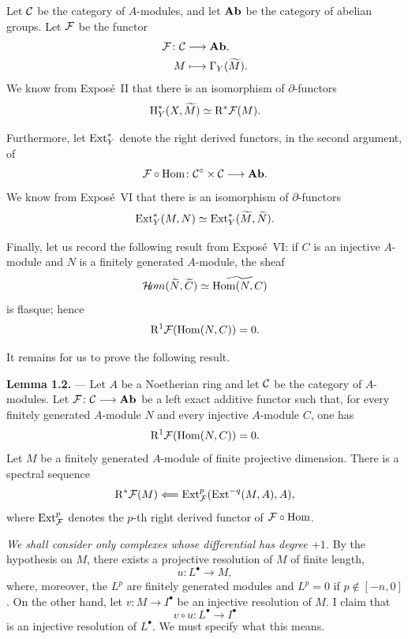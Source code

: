 Let $\mathcal C$ be the category of $A$-modules, and let $\mathbf{Ab}$ be the category of
abelian groups. Let $\cF$ be the functor
\[
  \begin{aligned}
    \cF\colon \CatC &\longrightarrow \Ab, \\
    M &\longmapsto \Gamma_Y(\widetilde M).
  \end{aligned}
\]
We know from Expos\'e~II that there is an isomorphism of $\partial$-functors
\[
  \Hloc_Y^*(X,\widetilde M)\simeq \R^*\cF(M).
\]

Furthermore, let $\operatorname{Ext}_Y^*$ denote the right derived functors, in the second
argument, of
\[
  \cF\circ\operatorname{Hom}\colon \CatC^{\circ}\times\CatC\longrightarrow\Ab.
\]
We know from Expos\'e~VI that there is an isomorphism of $\partial$-functors
\[
  \operatorname{Ext}_Y^*(M,N)\simeq \operatorname{Ext}_Y^*(\widetilde M,\widetilde N).
\]

Finally, let us record the following result from Expos\'e~VI: if $C$ is an
injective $A$-module and $N$ is a finitely generated $A$-module, the sheaf
\[
  \mathcal H\!om(\widetilde N,\widetilde C)
    \simeq \widetilde{\operatorname{Hom}(N,C)}
\]
is flasque; hence
\[
  \R^1\cF(\operatorname{Hom}(N,C))=0.
\]


It remains for us to prove the following result.

\medskip
{}\noindent\textbf{Lemma 1.2.} --- Let $A$ be a Noetherian ring and let $\mathcal C$
be the category of $A$-modules. Let
$\cF\colon\CatC\longrightarrow\Ab$ be a left exact additive functor such that,
for every finitely generated $A$-module $N$ and every injective $A$-module
$C$, one has
\[
  \R^1\cF(\operatorname{Hom}(N,C))=0.
\]
Let $M$ be a finitely generated $A$-module of finite projective dimension.
There is a spectral sequence
\[
  \R^\ast\cF(M)
    \Longleftarrow
  \Ext_{\cF}^{p}(\Ext^{-q}(M,A),A),
\]
where $\Ext_{\cF}^{p}$ denotes the $p$-th right derived functor of
$\cF\circ\operatorname{Hom}$.


\emph{We shall consider only complexes whose differential has degree $+1$.}
By the hypothesis on $M$, there exists a projective resolution of $M$ of
finite length,
\[
  u\colon L^\bullet\longrightarrow M,
\]
where, moreover, the $L^p$ are finitely generated modules and $L^p=0$ if
$p\notin[-n,0]$. On the other hand, let
$v\colon M\longrightarrow I^\bullet$ be an injective resolution of $M$. I
claim that
\begin{equation}
  v\circ u\colon L^\bullet\longrightarrow I^\bullet
  \tag{1.1}\label{eq:VIII.1.1}
\end{equation}
is an injective resolution of $L^\bullet$. We must specify what this means.

